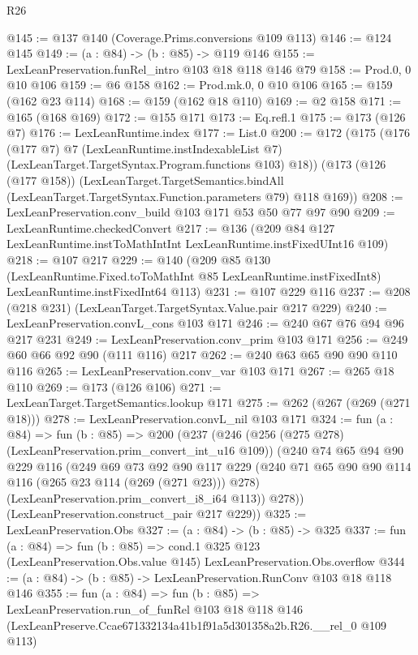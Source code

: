 \begin{lexlean}{R26}
\begin{coremodule}
@145 := @137 @140 (Coverage.Prims.conversions @109 @113)
@146 := @124 @145
@149 := (a : @84) -> (b : @85) -> @119 @146
@155 := LexLeanPreservation.funRel_intro @103 @18 @118 @146 @79
@158 := Prod.{0, 0} @10 @106
@159 := @6 @158
@162 := Prod.mk.{0, 0} @10 @106
@165 := @159 (@162 @23 @114)
@168 := @159 (@162 @18 @110)
@169 := @2 @158
@171 := @165 (@168 @169)
@172 := @155 @171
@173 := Eq.refl.{1}
@175 := @173 (@126 @7)
@176 := LexLeanRuntime.index
@177 := List.{0}
@200 := @172
    (@175
      (@176
        (@177 @7)
        @7
        (LexLeanRuntime.instIndexableList @7)
        (LexLeanTarget.TargetSyntax.Program.functions @103)
        @18))
    (@173
      (@126 (@177 @158))
      (LexLeanTarget.TargetSemantics.bindAll
        (LexLeanTarget.TargetSyntax.Function.parameters @79)
        @118
        @169))
@208 := LexLeanPreservation.conv_build @103 @171 @53 @50 @77 @97 @90
@209 := LexLeanRuntime.checkedConvert
@217 := @136 (@209 @84 @127 LexLeanRuntime.instToMathIntInt LexLeanRuntime.instFixedUInt16 @109)
@218 := @107 @217
@229 := @140
    (@209
      @85
      @130
      (LexLeanRuntime.Fixed.toToMathInt @85 LexLeanRuntime.instFixedInt8)
      LexLeanRuntime.instFixedInt64
      @113)
@231 := @107 @229 @116
@237 := @208 (@218 @231) (LexLeanTarget.TargetSyntax.Value.pair @217 @229)
@240 := LexLeanPreservation.convL_cons @103 @171
@246 := @240 @67 @76 @94 @96 @217 @231
@249 := LexLeanPreservation.conv_prim @103 @171
@256 := @249 @60 @66 @92 @90 (@111 @116) @217
@262 := @240 @63 @65 @90 @90 @110 @116
@265 := LexLeanPreservation.conv_var @103 @171
@267 := @265 @18 @110
@269 := @173 (@126 @106)
@271 := LexLeanTarget.TargetSemantics.lookup @171
@275 := @262 (@267 (@269 (@271 @18)))
@278 := LexLeanPreservation.convL_nil @103 @171
@324 := fun (a : @84) =>
  fun (b : @85) =>
  @200
    (@237
      (@246
        (@256 (@275 @278) (LexLeanPreservation.prim_convert_int_u16 @109))
        (@240
          @74
          @65
          @94
          @90
          @229
          @116
          (@249
            @69
            @73
            @92
            @90
            @117
            @229
            (@240 @71 @65 @90 @90 @114 @116 (@265 @23 @114 (@269 (@271 @23))) @278)
            (LexLeanPreservation.prim_convert_i8_i64 @113))
          @278))
      (LexLeanPreservation.construct_pair @217 @229))
@325 := LexLeanPreservation.Obs
@327 := (a : @84) -> (b : @85) -> @325
@337 := fun (a : @84) =>
  fun (b : @85) =>
  cond.{1} @325 @123 (LexLeanPreservation.Obs.value @145) LexLeanPreservation.Obs.overflow
@344 := (a : @84) -> (b : @85) -> LexLeanPreservation.RunConv @103 @18 @118 @146
@355 := fun (a : @84) =>
  fun (b : @85) =>
  LexLeanPreservation.run_of_funRel
    @103
    @18
    @118
    @146
    (LexLeanPreserve.Ccae671332134a41b1f91a5d301358a2b.R26.__rel_0 @109 @113)
\end{coremodule}
\end{lexlean}
